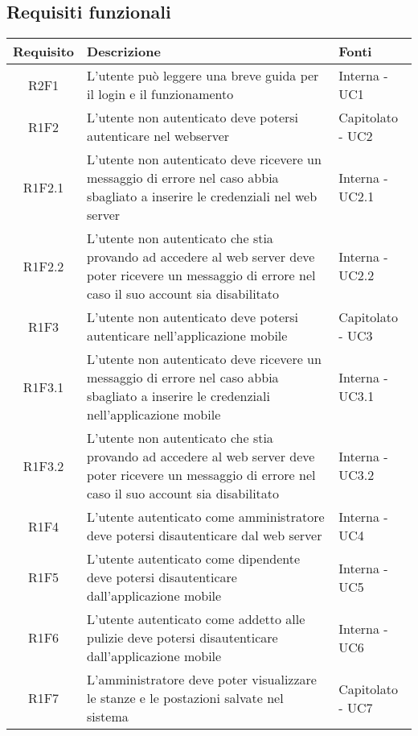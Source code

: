 \subsection{Requisiti funzionali}
\begin{center}
	\begin{longtable}{|c|p{10cm}|p{4cm}|}
		\hline
		\rowcolor{lighter-grayer}
		\textbf{Requisito} & \textbf{Descrizione} & \textbf{Fonti}  \\
		\hline
		\endhead
		
		 R2F1 & L'utente può leggere una breve guida per il login e il funzionamento & Interna - UC1 \\
		\hline
		R1F2	&	L'utente non autenticato deve potersi autenticare nel webserver & Capitolato - UC2	\\
		\hline
		R1F2.1	&	L'utente non autenticato deve ricevere un messaggio di errore nel caso abbia sbagliato a inserire le credenziali nel web server& Interna - UC2.1	\\
		\hline
		R1F2.2	&	L'utente non autenticato che stia provando ad accedere al web server deve poter ricevere un messaggio di errore nel caso il suo account sia disabilitato& Interna - UC2.2	\\
		\hline
		R1F3	&	L'utente non autenticato deve potersi autenticare nell'applicazione mobile & Capitolato - UC3	\\
		\hline
		R1F3.1	&	L'utente non autenticato deve ricevere un messaggio di errore nel caso abbia sbagliato a inserire le credenziali nell'applicazione mobile& Interna - UC3.1	\\
		\hline
		R1F3.2	&	L'utente non autenticato che stia provando ad accedere al web server deve poter ricevere un messaggio di errore nel caso il suo account sia disabilitato& Interna - UC3.2	\\
		\hline
		R1F4	&	L'utente autenticato come amministratore deve potersi disautenticare dal web server& Interna - UC4	\\
		\hline
		R1F5	&	L'utente autenticato come dipendente deve potersi disautenticare dall'applicazione mobile& Interna - UC5	\\
		\hline
		R1F6	&	L'utente autenticato come addetto alle pulizie deve potersi disautenticare dall'applicazione mobile& Interna - UC6	\\
		\hline
		R1F7&L'amministratore deve poter visualizzare le stanze e le postazioni salvate nel sistema& Capitolato - UC7	\\

\end{longtable}
\end{center}
